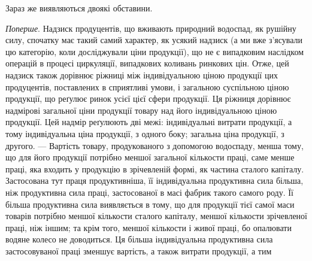 Зараз же виявляються двоякі обставини.

\emph{Поперше}. Надзиск продуцентів, що вживають природний водоспад, як
рушійну силу, спочатку має такий самий характер, як усякий надзиск (а ми
вже з’ясували цю категорію, коли досліджували ціни продукції), що не є
випадковим наслідком операцій в процесі циркуляції, випадкових коливань ринкових
цін. Отже, цей надзиск також дорівнює ріжниці між індивідуальною ціною продукції
цих продуцентів, поставлених в сприятливі умови, і загальною суспільною ціною
продукції, що реґулює ринок усієї цієї сфери продукції. Ця ріжниця дорівнює
надмірові загальної ціни продукції товару над його індивідуальною ціною продукції.
Цей надмір реґулюють дві межі: індивідуальні витрати продукції, а тому
індивідуальна ціна продукції, з одного боку; загальна ціна продукції, з другого. —
Вартість товару, продукованого з допомогою водоспаду, менша тому, що для
його продукції потрібно меншої загальної кількости праці, саме менше праці, яка
входить у продукцію в зрічевленій формі, як частина сталого капіталу. Застосована
тут праця продуктивніша, її індивідуальна продуктивна сила більша,
ніж продуктивна сила праці, застосованої в масі фабрик такого самого роду.
Її більша продуктивна сила виявляється в тому, що для продукції тієї самої
маси товарів потрібно меншої кількости сталого капіталу, меншої кількости
зрічевленої праці, ніж іншим; та крім того, меншої кількости і живої праці,
бо опалювати водяне колесо не доводиться. Ця більша індивідуальна продуктивна
сила застосовуваної праці зменшує вартість, а також витрати продукції, а тим
\parbreak{}  %
